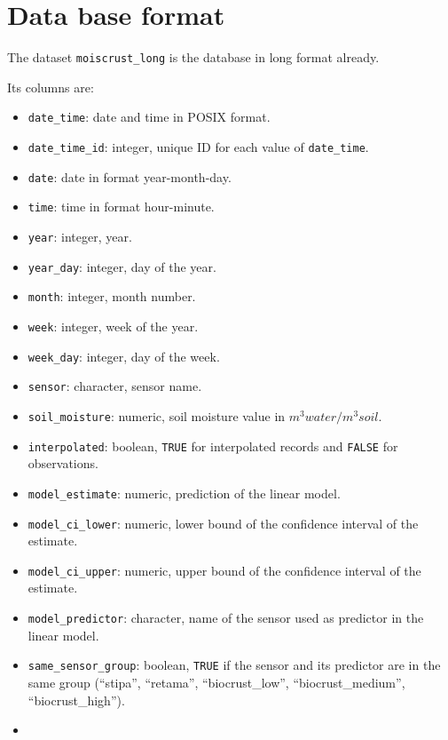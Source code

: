 \documentclass[]{article}
\providecommand{\tightlist}{%
  \setlength{\itemsep}{0pt}\setlength{\parskip}{0pt}}
\begin{document}
\hypertarget{data-base-format}{%
\section{Data base format}\label{data-base-format}}

The dataset \texttt{moiscrust\_long} is the database in long format
already.

Its columns are:

\begin{itemize}
\tightlist
\item
  \texttt{date\_time}: date and time in POSIX format.
\item
  \texttt{date\_time\_id}: integer, unique ID for each value of
  \texttt{date\_time}.
\item
  \texttt{date}: date in format year-month-day.
\item
  \texttt{time}: time in format hour-minute.
\item
  \texttt{year}: integer, year.
\item
  \texttt{year\_day}: integer, day of the year.
\item
  \texttt{month}: integer, month number.
\item
  \texttt{week}: integer, week of the year.
\item
  \texttt{week\_day}: integer, day of the week.
\item
  \texttt{sensor}: character, sensor name.
\item
  \texttt{soil\_moisture}: numeric, soil moisture value in
  \(m^{3} water /m^{3} soil\).
\item
  \texttt{interpolated}: boolean, \texttt{TRUE} for interpolated records
  and \texttt{FALSE} for observations.
\item
  \texttt{model\_estimate}: numeric, prediction of the linear model.
\item
  \texttt{model\_ci\_lower}: numeric, lower bound of the confidence
  interval of the estimate.
\item
  \texttt{model\_ci\_upper}: numeric, upper bound of the confidence
  interval of the estimate.
\item
  \texttt{model\_predictor}: character, name of the sensor used as
  predictor in the linear model.
\item
  \texttt{same\_sensor\_group}: boolean, \texttt{TRUE} if the sensor and
  its predictor are in the same group (``stipa'', ``retama'',
  ``biocrust\_low'', ``biocrust\_medium'', ``biocrust\_high'').
\item

\end{itemize}
\end{document}
